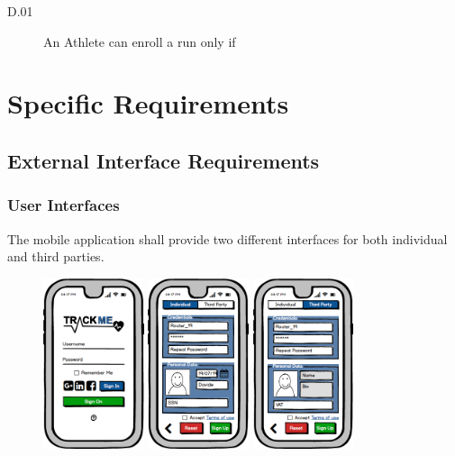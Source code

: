 \documentclass[a4paper]{article}
\begin{document}
        \begin{description}
            \item[D.01] An Athlete can enroll a run only if 
        \end{description}
        
\newpage
\section{Specific Requirements}

    \subsection{External Interface Requirements}
        
        \subsubsection{User Interfaces}
        
        The mobile application shall provide two different interfaces for both individual and third parties.
        
        \begin{figure}[!htpb]
    	\centering
    	\includegraphics[height=50mm]{images/mockups/Login_Registration.png}
    	\includegraphics[height=50mm]{images/mockups/RegistrationForm.png}
    	\includegraphics[height=50mm]{images/mockups/ThirdPartyRegistration.png}
        \end{figure}
        
\end{document}
